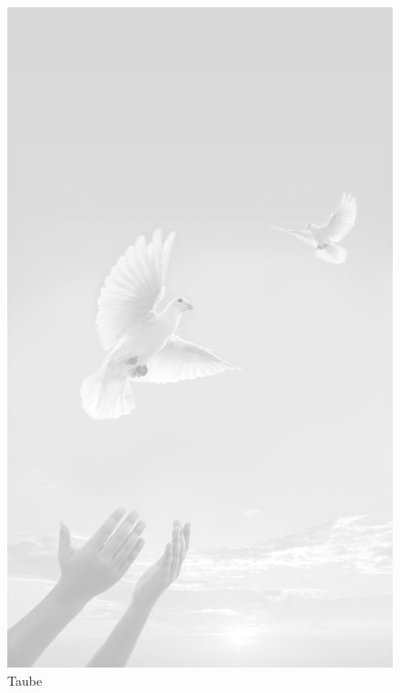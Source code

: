 \documentclass[ngerman,a4paper,11pt]{scrreprt}
\begin{document}
\begin{figure}[H]
\centering
\includegraphics[width=\textwidth,height=.8\textheight,keepaspectratio]{Bilder/Bilder/750_0010_18779_Todesanzeigen.jpg}
\caption{\label{img_Taube}Taube}
\end{figure}
\end{document}

